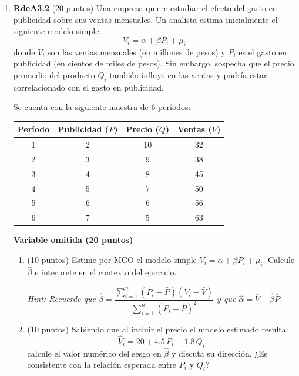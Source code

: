 \documentclass[10pt,a4paper]{article}
\begin{document}
\begin{enumerate}
\begin{enumerate}
\end{enumerate}





  \item \textbf{RdeA3.2} (20 puntos) 
Una empresa quiere estudiar el efecto del gasto en 
publicidad sobre sus ventas mensuales. Un analista estima inicialmente el siguiente 
modelo simple:
$$V_i = \alpha + \beta P_i + \mu_i$$
donde $V_i$ son las ventas mensuales (en millones de pesos) y $P_i$ es el gasto en 
publicidad (en cientos de miles de pesos). Sin embargo, sospecha que el precio promedio 
del producto $Q_i$ también influye en las ventas y podría estar correlacionado con el 
gasto en publicidad.

Se cuenta con la siguiente muestra de 6 períodos:

\begin{center}
\begin{tabular}{cccc}
\hline
\textbf{Período} & \textbf{Publicidad} ($P$) & \textbf{Precio} ($Q$) & \textbf{Ventas} ($V$) \\
\hline
1 & 2 & 10 & 32 \\
2 & 3 &  9 & 38 \\
3 & 4 &  8 & 45 \\
4 & 5 &  7 & 50 \\
5 & 6 &  6 & 56 \\
6 & 7 &  5 & 63 \\
\hline
\end{tabular}
\end{center}

\textbf{Variable omitida (20 puntos)}

\begin{enumerate}[label=(\alph*)]

\item (10 puntos) Estime por MCO el modelo simple $V_i = \alpha + \beta P_i + \mu_i$. 
Calcule $\hat{\beta}$ e interprete en el contexto del ejercicio.

\textit{Hint: Recuerde que $\hat{\beta} = \dfrac{\sum_{i=1}^n (P_i - \bar{P})(V_i - 
\bar{V})}{\sum_{i=1}^n (P_i - \bar{P})^2}$ y que $\hat{\alpha} = \bar{V} - 
\hat{\beta}\bar{P}$.}

\item (10 puntos) Sabiendo que al incluir el precio el modelo estimado resulta:
$$\hat{V}_i = 20 + 4.5\, P_i - 1.8\, Q_i$$
calcule el valor numérico del sesgo en $\hat{\beta}$ y discuta su dirección. 
¿Es consistente con la relación esperada entre $P_i$ y $Q_i$?


\end{enumerate}
\end{enumerate}
\end{document}
